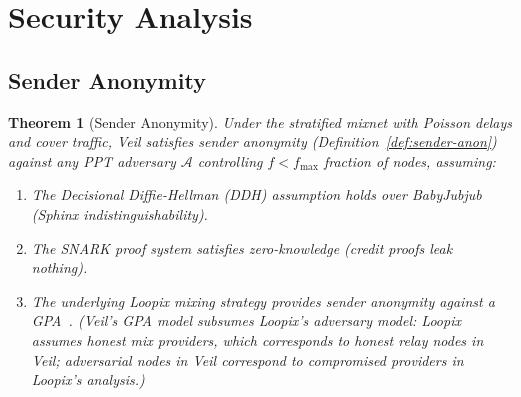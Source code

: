 \documentclass[11pt,a4paper]{article}
\newtheorem{theorem}{Theorem}
\newcommand{\Adv}{\mathcal{A}}
\begin{document}
\section{Security Analysis}
\label{sec:security}

\subsection{Sender Anonymity}

\begin{theorem}[Sender Anonymity]
\label{thm:sender-anon}
Under the stratified mixnet with Poisson delays and cover traffic, Veil satisfies sender anonymity (Definition~\ref{def:sender-anon}) against any PPT adversary $\Adv$ controlling $f < f_{\max}$ fraction of nodes, assuming:
\begin{enumerate}[nosep]
    \item The Decisional Diffie-Hellman (DDH) assumption holds over BabyJubjub (Sphinx indistinguishability).
    \item The SNARK proof system satisfies zero-knowledge (credit proofs leak nothing).
    \item The underlying Loopix mixing strategy provides sender anonymity against a GPA~\cite{loopix}. (Veil's GPA model subsumes Loopix's adversary model: Loopix assumes honest mix providers, which corresponds to honest relay nodes in Veil; adversarial nodes in Veil correspond to compromised providers in Loopix's analysis.)
\end{enumerate}
\end{theorem}
\end{document}
